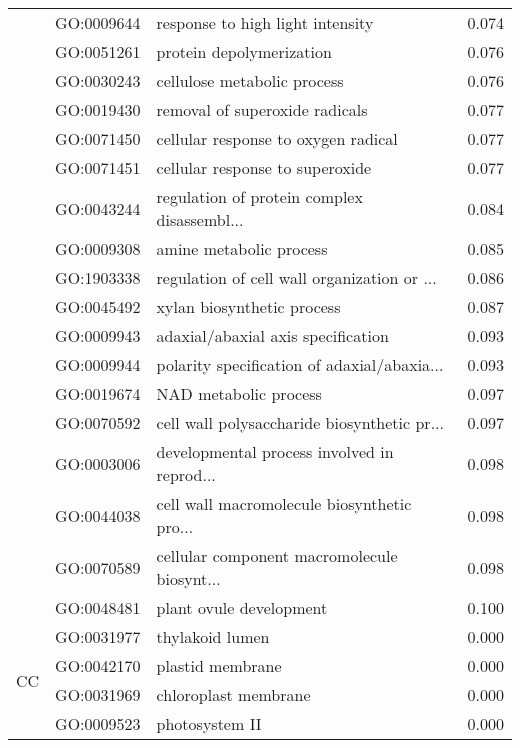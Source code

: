 \begin{longtable}{lllr}
   & GO:0009644 &             response to high light intensity &         0.074 \\
   & GO:0051261 &                     protein depolymerization &         0.076 \\
   & GO:0030243 &                  cellulose metabolic process &         0.076 \\
   & GO:0019430 &               removal of superoxide radicals &         0.077 \\
   & GO:0071450 &          cellular response to oxygen radical &         0.077 \\
   & GO:0071451 &              cellular response to superoxide &         0.077 \\
   & GO:0043244 &  regulation of protein complex disassembl... &         0.084 \\
   & GO:0009308 &                      amine metabolic process &         0.085 \\
   & GO:1903338 &  regulation of cell wall organization or ... &         0.086 \\
   & GO:0045492 &                   xylan biosynthetic process &         0.087 \\
   & GO:0009943 &           adaxial/abaxial axis specification &         0.093 \\
   & GO:0009944 &  polarity specification of adaxial/abaxia... &         0.093 \\
   & GO:0019674 &                        NAD metabolic process &         0.097 \\
   & GO:0070592 &  cell wall polysaccharide biosynthetic pr... &         0.097 \\
   & GO:0003006 &  developmental process involved in reprod... &         0.098 \\
   & GO:0044038 &  cell wall macromolecule biosynthetic pro... &         0.098 \\
   & GO:0070589 &  cellular component macromolecule biosynt... &         0.098 \\
   & GO:0048481 &                      plant ovule development &         0.100 \\
\cline{1-4}
\multirow{35}{*}{CC} & GO:0031977 &                              thylakoid lumen &         0.000 \\
   & GO:0042170 &                             plastid membrane &         0.000 \\
   & GO:0031969 &                         chloroplast membrane &         0.000 \\
   & GO:0009523 &                               photosystem II &         0.000 \\

\end{longtable}
